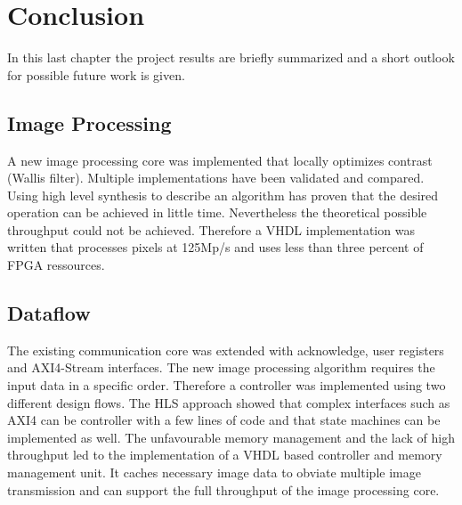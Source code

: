 %
%
\chapter{Conclusion}
In this last chapter the project results are briefly summarized and
a short outlook for possible future work is given.

%
%
\section{Image Processing}
A new image processing core was implemented that locally optimizes contrast 
(Wallis filter). Multiple implementations have been validated and compared.
Using high level synthesis to describe an algorithm has proven that the desired
operation can be achieved in little time. Nevertheless the theoretical possible
throughput could not be achieved. Therefore a VHDL implementation was written
that processes pixels at 125Mp/s and uses less than three percent of FPGA
ressources. 

%
%
\section{Dataflow}
The existing communication core was extended with acknowledge, user registers
and AXI4-Stream interfaces. The new image processing algorithm requires the
input data in a specific order. Therefore a controller was implemented using two
different design flows. The HLS approach showed that complex interfaces such as
AXI4 can be controller with a few lines of code and that state machines can be
implemented as well. The unfavourable memory management and the lack of high
throughput
led to the implementation of a VHDL based controller and memory management unit.
It caches necessary image data to obviate multiple image transmission and can
support the full throughput of the image processing core.

%
%
